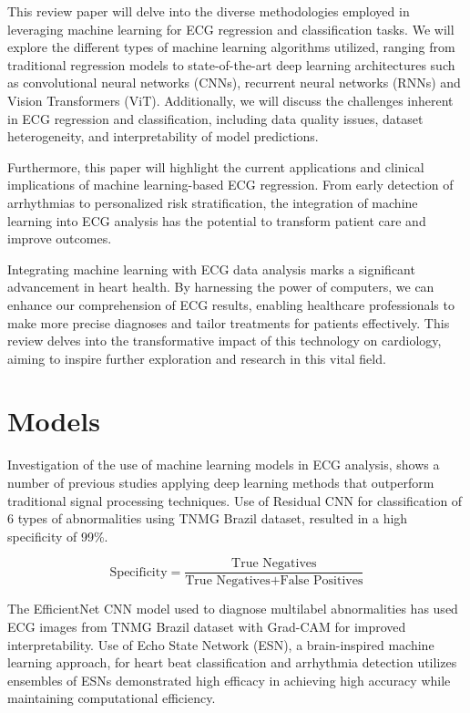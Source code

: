 \documentclass[conference]{IEEEtran}
\begin{document}
This review paper will delve into the diverse methodologies employed in leveraging machine learning for ECG regression and classification tasks. We will explore the different types of machine learning algorithms utilized, ranging from traditional regression models to state-of-the-art deep learning architectures such as convolutional neural networks (CNNs), recurrent neural networks (RNNs) and Vision Transformers (ViT). Additionally, we will discuss the challenges inherent in ECG regression and classification, including data quality issues, dataset heterogeneity, and interpretability of model predictions.

Furthermore, this paper will highlight the current applications and clinical implications of machine learning-based ECG regression. From early detection of arrhythmias to personalized risk stratification, the integration of machine learning into ECG analysis has the potential to transform patient care and improve outcomes.

Integrating machine learning with ECG data analysis marks a significant advancement in heart health. By harnessing the power of computers, we can enhance our comprehension of ECG results, enabling healthcare professionals to make more precise diagnoses and tailor treatments for patients effectively. This review delves into the transformative impact of this technology on cardiology, aiming to inspire further exploration and research in this vital field.


\section{Models}

Investigation of the use of machine learning models in ECG analysis, shows a number of previous studies applying deep learning methods that outperform traditional signal processing techniques\cite{b1}. Use of Residual CNN for classification of 6 types of abnormalities\cite{b2} using TNMG Brazil dataset, resulted in a high specificity of 99\%. 


\begin{equation}
\text{Specificity} = \frac{\text{True Negatives}}{\text{True Negatives} + \text{False Positives}}
\end{equation}

The EfficientNet CNN model used to diagnose multilabel abnormalities\cite{b3} has used ECG images from TNMG Brazil dataset with Grad-CAM for improved interpretability. Use of Echo State Network (ESN), a brain-inspired machine learning approach, for heart beat classification and arrhythmia detection\cite{b4} utilizes ensembles of ESNs \cite{b5} demonstrated high efficacy in achieving high accuracy while maintaining computational efficiency. 
\end{document}
